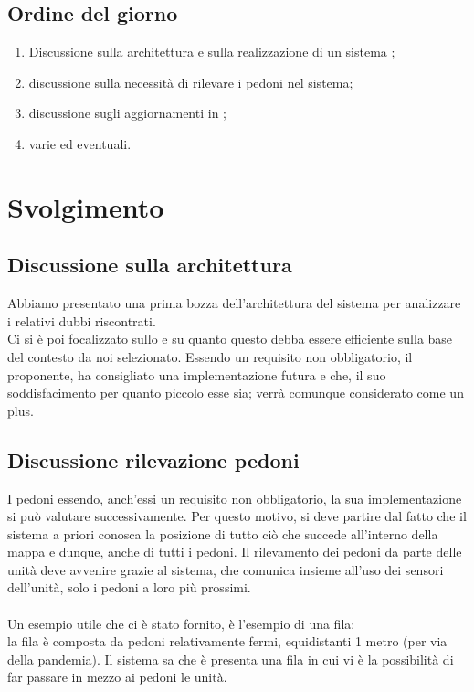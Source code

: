 \documentclass[]{article}
\begin{document}
	\subsection{Ordine del giorno}
	\begin{enumerate}
		\item  Discussione sulla architettura e sulla realizzazione di un sistema ;
		\item  discussione sulla necessità di rilevare i pedoni nel sistema;
		\item  discussione sugli aggiornamenti in ;
		\item  varie ed eventuali.
	\end{enumerate}
	\newpage
	\section{Svolgimento}


	\subsection{Discussione sulla architettura}
	Abbiamo presentato una prima bozza dell'architettura del sistema per analizzare i relativi dubbi riscontrati. \\
	Ci si è poi focalizzato sullo  e su quanto questo debba essere efficiente sulla base del contesto da noi selezionato. Essendo un requisito non obbligatorio, il proponente, ha consigliato una implementazione futura e che, il suo soddisfacimento per quanto piccolo esse sia; verrà comunque considerato come un plus.

	\subsection{Discussione rilevazione pedoni}
	I pedoni essendo, anch'essi un requisito non obbligatorio, la sua implementazione si può valutare successivamente. Per questo motivo, si deve partire dal fatto che il sistema a priori conosca la posizione di tutto ciò che succede all'interno della mappa e dunque, anche di tutti i pedoni.
	Il rilevamento dei pedoni da parte delle unità deve avvenire grazie al sistema, che comunica insieme all'uso dei sensori dell'unità, solo i pedoni a loro più prossimi.
	\\
	\\
	Un esempio utile che ci è stato fornito, è l'esempio di una fila:\\
	la fila è composta da pedoni relativamente fermi, equidistanti 1 metro (per via della pandemia). Il sistema sa che è presenta una fila in cui vi è la possibilità di far passare in mezzo ai pedoni le unità.
\end{document}
